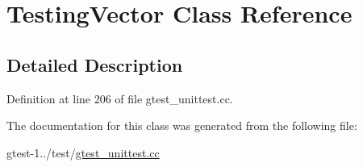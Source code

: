 \hypertarget{classTestingVector}{\section{\-Testing\-Vector \-Class \-Reference}
\label{d9/d01/classTestingVector}
}


\subsection{\-Detailed \-Description}


\-Definition at line 206 of file gtest\-\_\-unittest.\-cc.



\-The documentation for this class was generated from the following file\-:\begin{DoxyCompactItemize}
\item 
gtest-\/1../test/\hyperlink{gtest__unittest_8cc}{gtest\-\_\-unittest.\-cc}\end{DoxyCompactItemize}
